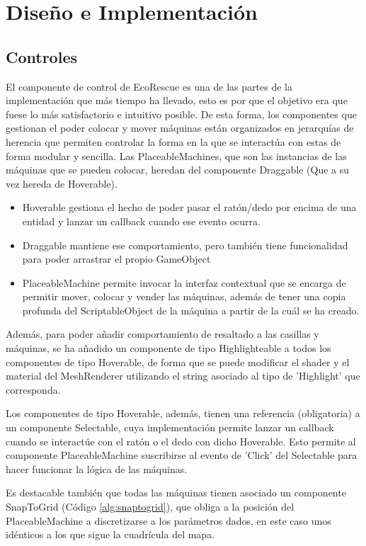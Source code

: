 \section{Diseño e Implementación} 

\subsection{Controles}

El componente de control de EcoRescue es una de las partes de la implementación que más tiempo ha llevado, esto es por que el objetivo era que fuese lo más satisfactorio e intuitivo posible. De esta forma, los componentes que gestionan el poder colocar y mover máquinas están organizados en jerarquías de herencia que permiten controlar la forma en la que se interactúa con estas de forma modular y sencilla. Las PlaceableMachines, que son las instancias de las máquinas que se pueden colocar, heredan del componente Draggable (Que a su vez hereda de Hoverable). 
\begin{itemize}
    \item Hoverable gestiona el hecho de poder pasar el ratón/dedo por encima de una entidad y lanzar un callback cuando ese evento ocurra. 
    \item Draggable mantiene ese comportamiento, pero también tiene funcionalidad para poder arrastrar el propio GameObject
    \item PlaceableMachine permite invocar la interfaz contextual que se encarga de permitir mover, colocar y vender las máquinas, además de tener una copia profunda del ScriptableObject de la máquina a partir de la cuál se ha creado. 
\end{itemize}

Además, para poder añadir comportamiento de resaltado a las casillas y máquinas, se ha añadido un componente de tipo Highlighteable a todos los componentes de tipo Hoverable, de forma que se puede modificar el shader y el material del MeshRenderer utilizando el string asociado al tipo de 'Highlight' que corresponda.

Los componentes de tipo Hoverable, además, tienen una referencia (obligatoria) a un componente Selectable, cuya implementación permite lanzar un callback cuando se interactúe con el ratón o el dedo con dicho Hoverable. Esto permite al componente PlaceableMachine suscribirse al evento de 'Click' del Selectable para hacer funcionar la lógica de las máquinas.

Es destacable también que todas las máquinas tienen asociado un componente SnapToGrid (Código \ref{alg:snaptogrid}), que obliga a la posición del PlaceableMachine a discretizarse a los parámetros dados, en este caso unos idénticos a los que sigue la cuadrícula del mapa.

